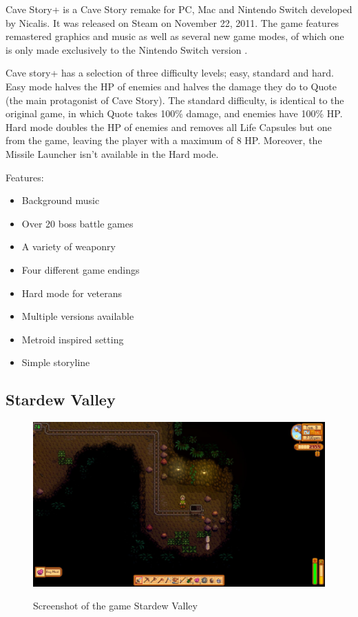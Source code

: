 \documentclass[12p]{article}
\begin{document}
Cave Story+ is a Cave Story remake for PC, Mac and Nintendo Switch developed by Nicalis. It was released on Steam on November 22, 2011. The game features remastered graphics and music as well as several new game modes, of which one is only made exclusively to the Nintendo Switch version \cite{CaveStoryPlusWiki}.

Cave story+ has a selection of three difficulty levels; easy, standard and hard. Easy mode halves the HP of enemies and halves the damage they do to Quote (the main protagonist of Cave Story). The standard difficulty, is identical to the original game, in which Quote takes 100\% damage, and enemies have 100\% HP. Hard mode doubles the HP of enemies and removes all Life Capsules but one from the game, leaving the player with a maximum of 8 HP. Moreover, the Missile Launcher isn't available in the Hard mode.

Features:

\begin{itemize}
  \item Background music
  \item Over 20 boss battle games
  \item A variety of weaponry
  \item Four different game endings
  \item Hard mode for veterans
  \item Multiple versions available
  \item Metroid inspired setting
  \item Simple storyline
\end{itemize}


\subsection{Stardew Valley}

\begin{figure}[ht]
  \center
  \includegraphics[width=1\textwidth]{StateOfTheArtScreenshots/stardew_valley}
  \label{StateOfTheArt_Screenshots_StardewValley}
  \caption{Screenshot of the game Stardew Valley \cite{StardewValleyScreenshot}}
\end{figure}
\end{document}
